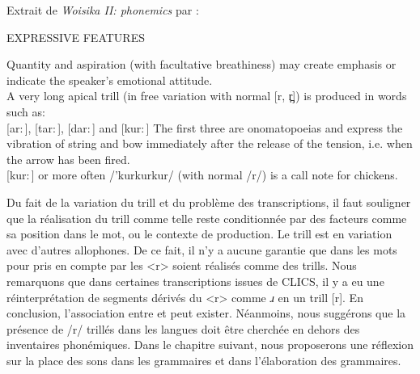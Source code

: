 \begin{displayquote} 
	
Extrait de \textit{Woisika II: phonemics} par \parencite[102--103]{stokhofWoisikaIIPhonemics1979}:
\begin{exe}  
	\ex EXPRESSIVE FEATURES
	\begin{xlistn} \label{ex:chicken}
		\item Quantity and aspiration (with facultative breathiness) may create emphasis or indicate the speaker's emotional attitude.\\	
		A very long apical trill (in free variation with normal [r, r̪]) is produced in words such as:\\
		\textrm{[ar$:$]}, [tar$:$], [dar$:$] and [kur$:$]
		The first three are onomatopoeias and express the vibration of string and bow immediately after the release of the tension, i.e. when the arrow has been fired.\\
		\textrm{[kur$:$]} or more often /'kurkurkur/ (with normal /r/) is a call note for chickens.
	\end{xlistn}
\end{exe}

\end{displayquote}

Du fait de la variation du trill et du problème des transcriptions, il faut souligner que la réalisation du trill comme telle reste conditionnée par des facteurs comme sa position dans le mot, ou le contexte de production. Le trill est en variation avec d'autres allophones. De ce fait, il n'y a aucune garantie que dans les mots pour  pris en compte par \textcite{winterTrilledAssociatedRoughness2022} les <r> soient réalisés comme des trills. Nous remarquons que dans certaines transcriptions issues de CLICS, il y a eu une réinterprétation de segments dérivés du <r> comme \textit{ɹ} en un trill [r].
En conclusion, l'association entre  et  peut exister. Néanmoins, nous suggérons que la présence de /r/ trillés dans les langues doit être cherchée en dehors des inventaires phonémiques.
Dans le chapitre suivant, nous proposerons une réflexion sur la place des sons dans les grammaires et dans l'élaboration des grammaires.